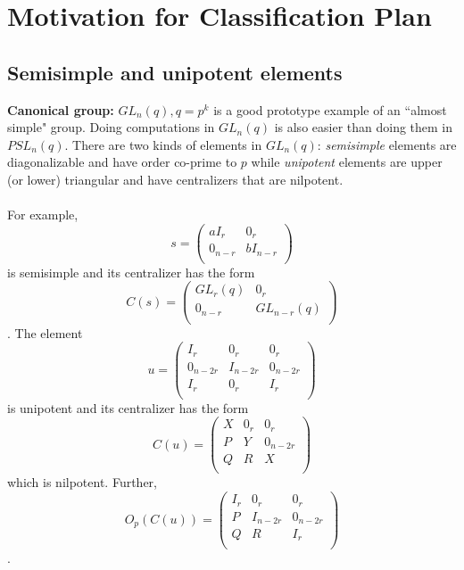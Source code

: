 \chapter{Motivation for Classification Plan}
\section {Semisimple and unipotent elements}
{\bf Canonical group:}  $GL_n(q), q=p^k$ is a good prototype example of an ``almost simple" group.  Doing computations in
$GL_n(q)$ is also easier than doing them in $PSL_n(q)$.  There are two kinds of elements in $GL_n(q)$:
\emph{semisimple} elements are diagonalizable and have order co-prime to $p$ while 
\emph{unipotent} elements are upper (or lower) triangular and have centralizers
that are nilpotent. 
\\
\\
For example,
$$
s =\left(
\begin{array}{cc}
aI_r &  0_{r} \\
0_{n-r} &  bI_{n-r} \\
\end{array}
\right)
$$ is semisimple and its centralizer has the form
$$
C(s)=
\left(
\begin{array}{cc}
GL_r(q) &  0_{r} \\
0_{n-r} &  GL_{n-r}(q)\\
\end{array}
\right)
$$.  The element
$$
u =\left(
\begin{array}{ccc}
I_r &  0_{r} & 0_{r}\\
0_{n-2r} &  I_{n-2r} & 0_{n-2r}\\
I_r &  0_{r} & I_r\\
\end{array}
\right)
$$ is unipotent and its centralizer has the form
$$
C(u)=
\left(
\begin{array}{ccc}
X &  0_{r} & 0_r\\
P &  Y & 0_{n-2r}\\
Q & R & X\\
\end{array}
\right)
$$ which is nilpotent.  Further, 
$$
O_p(C(u))=
\left(
\begin{array}{ccc}
I_r &  0_{r} & 0_r\\
P &  I_{n-2r} & 0_{n-2r}\\
Q & R & I_r\\
\end{array}
\right)
$$.
\\
\\
